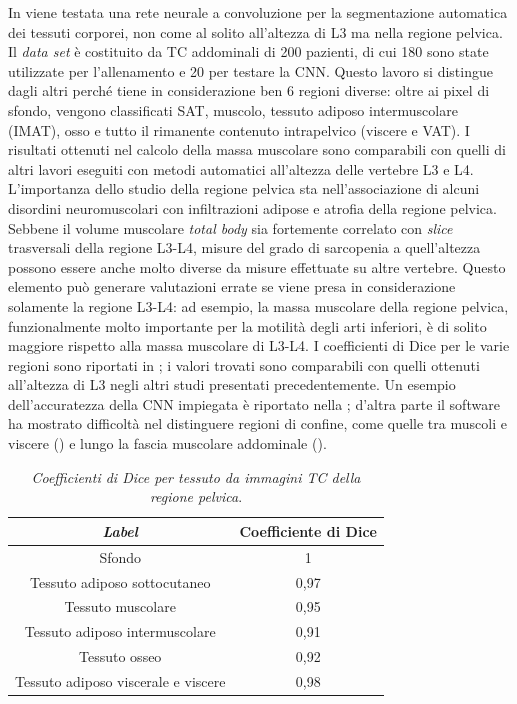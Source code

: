 In \cite{Hemke2020} viene testata una rete neurale a convoluzione per la segmentazione automatica dei tessuti corporei, non come al solito all'altezza di L3 ma nella regione pelvica. Il \textit{data set} è costituito da TC addominali di 200 pazienti, di cui 180 sono state utilizzate per l’allenamento e 20 per testare la CNN. Questo lavoro si distingue dagli altri perché tiene in considerazione ben 6 regioni diverse: oltre ai pixel di sfondo, vengono classificati SAT, muscolo, tessuto adiposo intermuscolare (IMAT), osso e tutto il rimanente contenuto intrapelvico (viscere e VAT). I risultati ottenuti nel calcolo della massa muscolare sono comparabili con quelli di altri lavori eseguiti con metodi automatici all'altezza delle vertebre L3 e L4. L’importanza dello studio della regione pelvica sta nell'associazione di alcuni disordini neuromuscolari con infiltrazioni adipose e atrofia della regione pelvica. Sebbene il volume muscolare \textit{total body} sia fortemente correlato con \textit{slice} trasversali della regione L3-L4, misure del grado di sarcopenia a quell'altezza possono essere anche molto diverse da misure effettuate su altre vertebre. Questo elemento può generare valutazioni errate se viene presa in considerazione solamente la regione L3-L4: ad esempio, la massa muscolare della regione pelvica, funzionalmente molto importante per la motilità degli arti inferiori, è di solito maggiore rispetto alla massa muscolare di L3-L4. I coefficienti di Dice per le varie regioni sono riportati in ; i valori trovati sono comparabili con quelli ottenuti all'altezza di L3 negli altri studi presentati precedentemente. Un esempio dell'accuratezza della CNN impiegata è riportato nella ; d'altra parte il software ha mostrato difficoltà nel distinguere regioni di confine, come quelle tra muscoli e viscere () e lungo la fascia muscolare addominale ().
\begin{table}[htp]
    \centering
    \begin{tabular}{|c|c|}
        \hline
        \textit{Label}                      & Coefficiente di Dice  \\ \hline
        Sfondo                              & 1                     \\
        Tessuto adiposo sottocutaneo        & 0,97                  \\
        Tessuto muscolare                   & 0,95                  \\
        Tessuto adiposo intermuscolare      & 0,91                  \\
        Tessuto osseo                       & 0,92                  \\
        Tessuto adiposo viscerale e viscere & 0,98                  \\ \hline
    \end{tabular}
    \caption{\textit{Coefficienti di Dice per tessuto da immagini TC della regione pelvica}.}
    \label{tab:dice}
\end{table}

